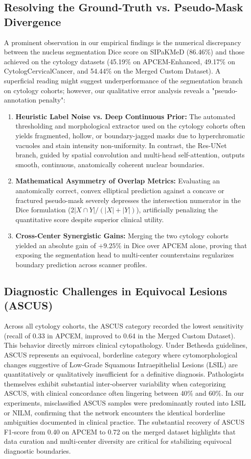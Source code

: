 \documentclass[pdflatex,sn-nature]{sn-jnl}%
\theoremstyle{thmstyleone}%
\theoremstyle{thmstyletwo}%
\theoremstyle{thmstylethree}%
\begin{document}
\subsection{Resolving the Ground-Truth vs. Pseudo-Mask Divergence}
A prominent observation in our empirical findings is the numerical discrepancy between the nucleus segmentation Dice score on SIPaKMeD (86.46\%) and those achieved on the cytology datasets (45.19\% on APCEM-Enhanced, 49.17\% on CytologCervicalCancer, and 54.44\% on the Merged Custom Dataset). A superficial reading might suggest underperformance of the segmentation branch on cytology cohorts; however, our qualitative error analysis reveals a "pseudo-annotation penalty":
\begin{enumerate}
    \item \textbf{Heuristic Label Noise vs. Deep Continuous Prior:} The automated thresholding and morphological extractor used on the cytology cohorts often yields fragmented, hollow, or boundary-jagged masks due to hyperchromatic vacuoles and stain intensity non-uniformity. In contrast, the Res-UNet branch, guided by spatial convolution and multi-head self-attention, outputs smooth, continuous, anatomically coherent nuclear boundaries.
    \item \textbf{Mathematical Asymmetry of Overlap Metrics:} Evaluating an anatomically correct, convex elliptical prediction against a concave or fractured pseudo-mask severely depresses the intersection numerator in the Dice formulation ($2|X \cap Y| / (|X| + |Y|)$), artificially penalizing the quantitative score despite superior clinical utility.
    \item \textbf{Cross-Center Synergistic Gains:} Merging the two cytology cohorts yielded an absolute gain of $+9.25\%$ in Dice over APCEM alone, proving that exposing the segmentation head to multi-center counterstains regularizes boundary prediction across scanner profiles.
\end{enumerate}

\subsection{Diagnostic Challenges in Equivocal Lesions (ASCUS)}
Across all cytology cohorts, the ASCUS category recorded the lowest sensitivity (recall of 0.33 in APCEM, improved to 0.64 in the Merged Custom Dataset). This behavior directly mirrors clinical cytopathology. Under Bethesda guidelines, ASCUS represents an equivocal, borderline category where cytomorphological changes suggestive of Low-Grade Squamous Intraepithelial Lesions (LSIL) are quantitatively or qualitatively insufficient for a definitive diagnosis. Pathologists themselves exhibit substantial inter-observer variability when categorizing ASCUS, with clinical concordance often lingering between 40\% and 60\%. In our experiments, misclassified ASCUS samples were predominantly routed into LSIL or NILM, confirming that the network encounters the identical borderline ambiguities documented in clinical practice. The substantial recovery of ASCUS F1-score from 0.40 on APCEM to 0.72 on the merged dataset highlights that data curation and multi-center diversity are critical for stabilizing equivocal diagnostic boundaries.
\end{document}
